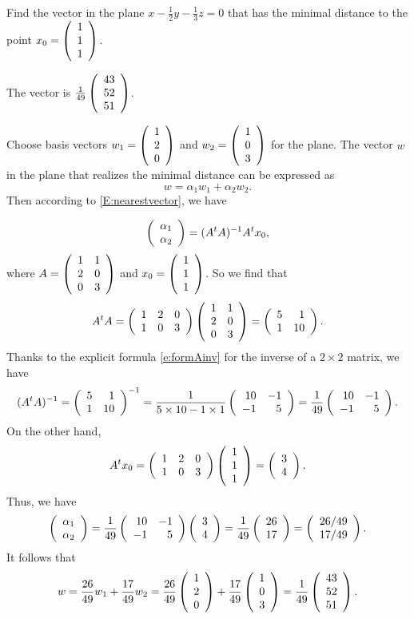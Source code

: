 \documentclass{ximera}
\begin{document}
\begin{exercise} \label{YZ_9.1.3}
Find the vector in the plane $x-\frac12 y-\frac13 z=0$ that has the minimal distance to the point $x_0=\Matrix{1\\1\\1}$.

\begin{solution}

\ans The vector is $\frac{1}{49}\Matrix{43\\52\\51}$.

\soln Choose basis vectors $w_1=\Matrix{1\\2\\0}$ and $w_2=\Matrix{1\\0\\3}$ for the plane. The vector 
$w$ in the plane that realizes the minimal distance can be expressed as 
\[
w=\alpha_1w_1+\alpha_2w_2.
\]
Then according to \eqref{E:nearestvector}, we have

\[
\Matrix{\alpha_1\\\alpha_2}=(A^tA)^{-1}A^tx_0,
\]
where $A=\Matrix{1&1\\2&0\\0&3}$ and $x_0=\Matrix{1\\1\\1}$. So we find that 
\[
A^tA=\Matrix{1 & 2&0\\1&0&3}\Matrix{1&1\\2&0\\0&3}=\Matrix{5&1\\1&10}.
\]
Thanks to the explicit formula \eqref{e:formAinv} for the inverse of a $2\times 2$ matrix, we have
\[
(A^tA)^{-1}=\Matrix{5&1\\1&10}^{-1}=\frac{1}{5\times 10-1\times 1}\Matrix{ 10 & -1\\-1& 5}=\frac{1}{49}\Matrix{10& -1\\-1& 5}.
\]
On the other hand, 
\[
A^tx_0=\Matrix{1 & 2&0\\1&0&3}\Matrix{1\\1\\1}=\Matrix{3\\4}. 
\]
Thus, we have 
\[
\Matrix{\alpha_1\\\alpha_2}=\frac{1}{49}\Matrix{10& -1\\-1& 5}\Matrix{3\\4}=\frac{1}{49}\Matrix{26\\17}=\Matrix{26/49\\17/49}.
\]
It follows that 
\[
w=\frac{26}{49}w_1+\frac{17}{49}w_2=\frac{26}{49}\Matrix{1\\2\\0}+\frac{17}{49}\Matrix{1\\0\\3}=\frac{1}{49}\Matrix{43\\52\\51}.
\]
\end{solution}
\end{exercise}
\end{document}
